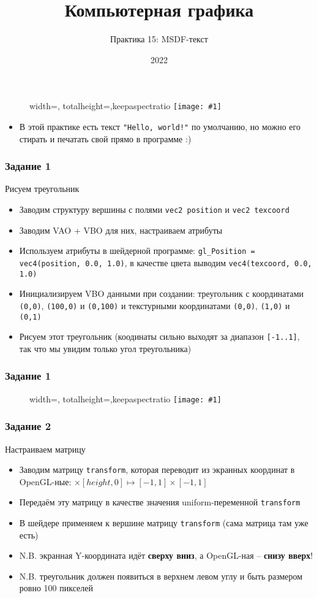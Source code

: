 \documentclass{beamer}
\title{Компьютерная графика}
\subtitle{Практика 15: MSDF-текст}
\date{2022}
\newcommand{\slideimage}[1]{
  \begin{figure}
    \begin{adjustbox}{width=\textwidth, totalheight=\textheight-2\baselineskip-2\baselineskip,keepaspectratio}
      \texttt{[image: \#1]}
    \end{adjustbox}
  \end{figure}
}
\begin{document}
\frame{\titlepage}

\begin{frame}
\slideimage{0.png}
\end{frame}

\begin{frame}[fragile]
\begin{itemize}
\item В этой практике есть текст \verb|"Hello, world!"| по умолчанию, но можно его стирать и печатать свой прямо в программе :)
\end{itemize}
\end{frame}

\begin{frame}[fragile]
\frametitle{Задание 1}
Рисуем треугольник
\begin{itemize}
\item Заводим структуру вершины с полями \verb|vec2 position| и \verb|vec2 texcoord|
\item Заводим VAO + VBO для них, настраиваем атрибуты
\item Используем атрибуты в шейдерной программе: \verb|gl_Position = vec4(position, 0.0, 1.0)|, в качестве цвета выводим \verb|vec4(texcoord, 0.0, 1.0)|
\item Инициализируем VBO данными при создании: треугольник с координатами \verb|(0,0)|, \verb|(100,0)| и \verb|(0,100)| и текстурными координатами \verb|(0,0)|, \verb|(1,0)| и \verb|(0,1)|
\item Рисуем этот треугольник (коодинаты сильно выходят за диапазон \verb|[-1..1]|, так что мы увидим только угол треугольника)
\end{itemize}
\end{frame}

\begin{frame}
\frametitle{Задание 1}
\slideimage{1.png}
\end{frame}

\begin{frame}[fragile]
\frametitle{Задание 2}
Настраиваем матрицу
\begin{itemize}
\item Заводим матрицу \verb|transform|, которая переводит из экранных координат в OpenGL-ные: \begin{math}[0, width] \times [height, 0] \mapsto [-1, 1]\times[-1,1]\end{math}
\item Передаём эту матрицу в качестве значения uniform-переменной \verb|transform|
\item В шейдере применяем к вершине матрицу \verb|transform| (сама матрица там уже есть)
\item N.B. экранная Y-координата идёт \textbf{сверху вниз}, а OpenGL-ная -- \textbf{снизу вверх}!
\item N.B. треугольник должен появиться в верхнем левом углу и быть размером ровно 100 пикселей
\end{itemize}
\end{frame}
\end{document}
